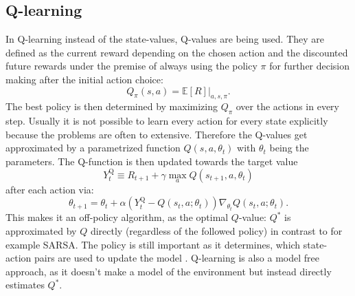 \subsection{Q-learning}
In Q-learning \cite{DBLP:journals/corr/HasseltGS15} instead of the state-values, Q-values are being used. They are defined as the current reward depending on the chosen action and the discounted future rewards under the premise of always using the policy $\pi$ for further decision making after the initial action choice:
\begin{equation}
Q_\pi(s,a)=\mathbb{E}\left[R\right]|_{a,s,\pi}.
\end{equation} 
The best policy is then determined by maximizing $Q_\pi$ over the actions in every step.
Usually it is not possible to learn every action for every state explicitly because the problems are often to extensive. Therefore the Q-values get approximated by a parametrized function $Q(s,a,\theta_t)$ with $\theta_t$ being the parameters. The Q-function is then updated towards the target value
\begin{equation}Y_{t}^{\mathrm{Q}} \equiv R_{t+1}+\gamma \max _{a} Q\left(s_{t+1}, a , \theta_{t}\right)
\end{equation}
after each action via:
\begin{equation}
\theta_{t+1}=\theta_{t}+\alpha\left(Y_{t}^{\mathrm{Q}}-Q\left(s_{t}, a; \theta_{t}\right)\right) \nabla_{\theta_{t}} Q\left(s_{t}, a ; \theta_{t}\right).
\end{equation}
This makes it an off-policy algorithm, as the optimal $Q$-value: $Q^*$ is approximated by $Q$ directly (regardless of the followed policy) in contrast to for example SARSA. The policy is still important as it determines, which state-action pairs are used to update the model \cite{Sutton:1998:IRL:551283}. 
Q-learning is also a model free approach, as it doesn't make a model of the environment but instead directly estimates $Q^*$.\\
